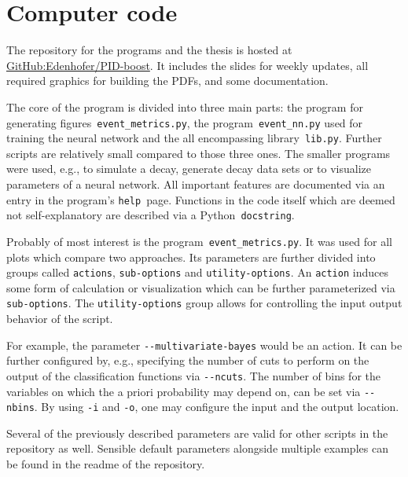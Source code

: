 \chapter{Computer code}
\label{chap:computer_code}

The repository for the programs and the thesis is hosted at \href{https://github.com/Edenhofer/PID-boost}{GitHub:Edenhofer/PID-boost}. It includes the slides for weekly updates, all required graphics for building the PDFs, and some documentation.

The core of the program is divided into three main parts: the program for generating figures~\lstinline|event_metrics.py|, the program~\lstinline|event_nn.py| used for training the neural network and the all encompassing library~\lstinline|lib.py|. Further scripts are relatively small compared to those three ones. The smaller programs were used, e.g., to simulate a decay, generate decay data sets or to visualize parameters of a neural network. All important features are documented via an entry in the program's \lstinline|help|~page. Functions in the code itself which are deemed not self-explanatory are described via a Python~\lstinline|docstring|.

Probably of most interest is the program~\lstinline|event_metrics.py|. It was used for all plots which compare two approaches. Its parameters are further divided into groups called \lstinline|actions|, \lstinline|sub-options| and \lstinline|utility-options|. An \lstinline|action| induces some form of calculation or visualization which can be further parameterized via \lstinline|sub-options|. The \lstinline|utility-options| group allows for controlling the input output behavior of the script.

For example, the parameter \lstinline|--multivariate-bayes| would be an action. It can be further configured by, e.g., specifying the number of cuts to perform on the output of the classification functions via \lstinline|--ncuts|. The number of bins for the variables on which the a priori probability may depend on, can be set via \lstinline|--nbins|. By using \lstinline|-i| and \lstinline|-o|, one may configure the input and the output location.

Several of the previously described parameters are valid for other scripts in the repository as well. Sensible default parameters alongside multiple examples can be found in the readme of the repository.
